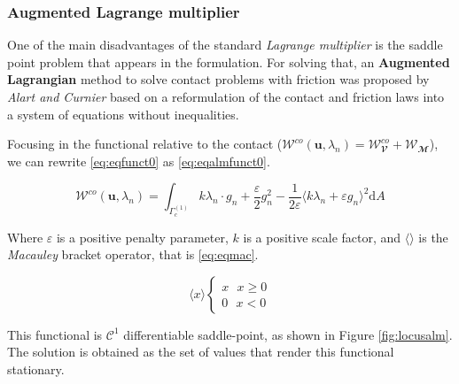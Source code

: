 \documentclass[a4paper,10pt]{article} %
\begin{document}
\subsubsection{Augmented Lagrange multiplier}

One of the main disadvantages of the standard \textit{Lagrange multiplier} is the saddle point problem that appears in the formulation. For solving that, an \textbf{Augmented Lagrangian} method to solve contact problems with friction was proposed by \textit{Alart and Curnier}\cite{alart} based on a reformulation of the contact and friction laws into a system
of equations without inequalities. 

Focusing in the functional relative to the contact ($\mathcal{W}^{co}(\mathbf{u},\lambda_n) = \mathcal{W}^{co}_\mathbfcal{V} + \mathcal{W}_\mathbfcal{M}$), we can rewrite \eqref{eq:eqfunct0} as \eqref{eq:eqalmfunct0}.

\begin{equation}\label{eq:eqalmfunct0}
    \mathcal{W}^{co}(\mathbf{u},\lambda_n) = \int_{\Gamma_c^{(1)}} k \lambda_n \cdot g_n  + \frac{\varepsilon}{2} g_n^2 - \frac{1}{2\varepsilon} \langle k \lambda_n + \varepsilon g_n \rangle^2\text{d}A
\end{equation}

Where $\varepsilon$ is a positive penalty parameter, $k$ is a positive scale factor, and $\langle \rangle$ is the \textit{Macauley} bracket operator, that is \eqref{eq:eqmac}.

\begin{equation}\label{eq:eqmac}
    \langle x \rangle \begin{cases} x \text{ } x \geq 0\\ 0 \text{ } x < 0 \end{cases}
\end{equation}

This functional is $\mathcal{C}^1$ differentiable saddle-point, as shown in Figure \ref{fig:locusalm}. The solution is obtained as the set of values that render this functional stationary. 
\end{document}
